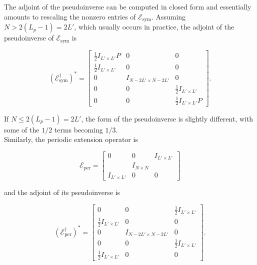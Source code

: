 \documentclass[journal]{IEEEtran}
\begin{document}
\noindent The adjoint of the pseudoinverse can be computed in closed form and essentially amounts to rescaling the nonzero entries of $\mathcal{E}_\text{sym}$.  Assuming $N > 2(L_p-1)=2L'$, which usually occurs in practice, the adjoint of the  pseudoinverse of $\mathcal{E}_\text{sym}$ is 

\[ \left(\mathcal{E}_\text{sym}^\dagger\right)^\ast = \begin{bmatrix}\frac{1}{2}I_{L'\times L'}P & 0 & 0\\\frac{1}{2}I_{L'\times L'} & 0 & 0\\0 & I_{N-2L'\times N-2L'} & 0\\0&0&\frac{1}{2}I_{L'\times L'}\\0&0&\frac{1}{2}I_{L'\times L'}P\end{bmatrix}. \]

\noindent If ${N \le 2(L_p-1)=2L'}$, the form of the pseudoinverse is slightly different, with some of the $1/2$ terms becoming $1/3$.\\%

Similarly, the periodic extension operator is

\[ \mathcal{E}_\text{per} = \begin{bmatrix} 0 & 0 & I_{L'\times L'}\\&I_{N\times N}&\\I_{L'\times L'}&0&0\end{bmatrix} \] 

\noindent and the adjoint of its pseudoinverse is

\[ \left(\mathcal{E}_\text{per}^\dagger\right)^\ast = \begin{bmatrix} 0 & 0 & \frac{1}{2}I_{L'\times L'}\\\frac{1}{2}I_{L'\times L'}&0&0\\0&I_{N-2L'\times N-2L'}&0\\0&0&\frac{1}{2}I_{L'\times L'}\\\frac{1}{2}I_{L'\times L'}&0&0\end{bmatrix}. \] 
\end{document}
